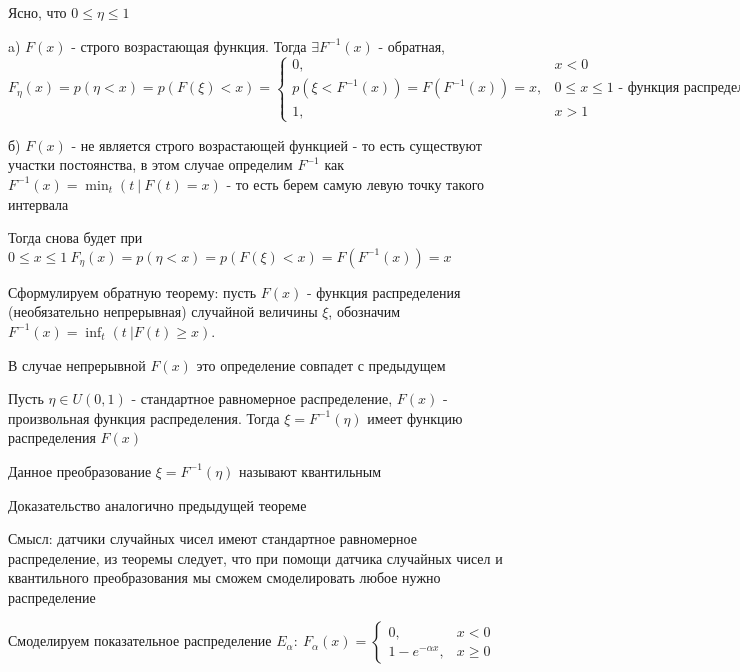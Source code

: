 \documentclass[12pt]{article}
\begin{document}
    \begin{MyProof}
        Ясно, что $0 \leq \eta \leq 1$

        a) $F(x)$ - строго возрастающая функция. Тогда $\exists F^{-1}(x)$ - обратная, $F_\eta(x) = p(\eta < x) = p(F(\xi) < x) = 
        \begin{cases}0, & x < 0 \\ p(\xi < F^{-1}(x)) = F(F^{-1}(x)) = x, & 0 \leq x \leq 1 \text{ - функция распределения } U(0, 1) \\ 1, & x > 1 \end{cases}$

        б) $F(x)$ - не является строго возрастающей функцией - то есть существуют участки постоянства, в этом случае
        определим $F^{-1}$ как $F^{-1}(x) = \min_{t} (t \ | \ F(t) = x)$ - то есть берем самую левую точку такого интервала

        Тогда снова будет при $0 \leq x \leq 1 \ F_\eta(x) = p(\eta < x) = p(F(\xi) < x) = F(F^{-1}(x)) = x$

    \end{MyProof}

    Сформулируем обратную теорему: пусть $F(x)$ - функция распределения (необязательно непрерывная) случайной величины $\xi$,
    обозначим $F^{-1}(x) = \inf_t (t \ | F(t) \geq x)$.

    В случае непрерывной $F(x)$ это определение совпадет с предыдущем

    \begin{MyTheorem}
         Пусть $\eta \in U(0, 1)$ - стандартное равномерное распределение, $F(x)$ - произвольная функция распределения. 
        Тогда $\xi = F^{-1}(\eta)$ имеет функцию распределения $F(x)$
    \end{MyTheorem}

    Данное преобразование $\xi = F^{-1}(\eta)$ называют квантильным

    Доказательство аналогично предыдущей теореме
    
    Смысл: датчики случайных чисел имеют стандартное равномерное распределение, из теоремы следует, что при помощи
    датчика случайных чисел и квантильного преобразования мы сможем смоделировать любое нужно распределение

     Смоделируем показательное распределение $E_\alpha: \ F_\alpha(x) = \begin{cases}0, & x < 0 \\ 1 - e^{-\alpha x}, & x \geq 0\end{cases}$
\end{document}
